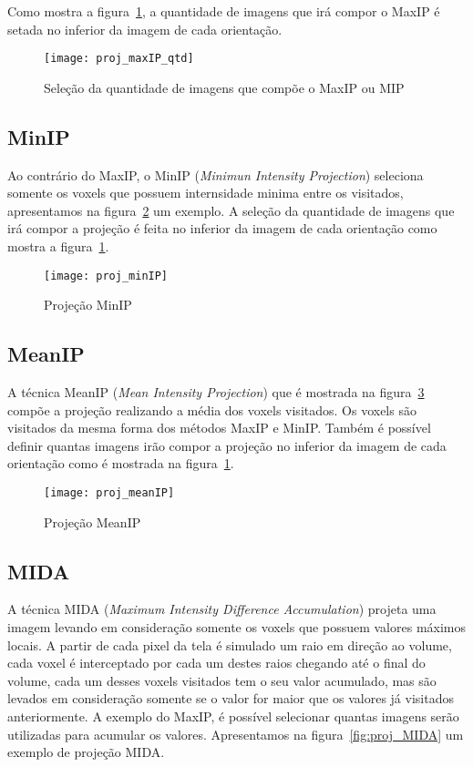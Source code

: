 Como mostra a figura~\ref{fig:proj_maxip_qtd}, a quantidade de imagens que irá compor o MaxIP é setada no inferior da imagem de cada orientação.

\begin{figure}[H]
\centering
\texttt{[image: proj\_maxIP\_qtd]}
\caption{Seleção da quantidade de imagens que compõe o MaxIP ou MIP}
\label{fig:proj_maxip_qtd}
\end{figure}

\subsection{MinIP}

Ao contrário do MaxIP, o MinIP (\textit{Minimun Intensity Projection}) seleciona somente os voxels que possuem internsidade minima entre os visitados, apresentamos na figura~\ref{fig:proj_minIP} um exemplo. A seleção da quantidade de imagens que irá compor a projeção é feita no inferior da imagem de cada orientação como mostra a figura~\ref{fig:proj_maxip_qtd}.

\begin{figure}[H]
\centering
\texttt{[image: proj\_minIP]}
\caption{Projeção MinIP}
\label{fig:proj_minIP}
\end{figure}

\subsection{MeanIP}
A técnica MeanIP (\textit{Mean Intensity Projection}) que é mostrada na figura~\ref{fig:proj_meanIP} compõe a projeção realizando a média dos voxels visitados. Os voxels são visitados da mesma forma dos métodos MaxIP e MinIP. Também é possível definir quantas imagens irão compor a projeção no inferior da imagem de cada orientação como é mostrada na figura~\ref{fig:proj_maxip_qtd}.

\begin{figure}[H]
\centering
\texttt{[image: proj\_meanIP]}
\caption{Projeção MeanIP}
\label{fig:proj_meanIP}
\end{figure}

\subsection{MIDA}
\label{sub:mida}
A técnica MIDA (\textit{Maximum Intensity Difference Accumulation}) projeta uma imagem levando em consideração somente os voxels que possuem valores máximos locais. A partir de cada pixel da tela é simulado um raio em direção ao volume, cada voxel é interceptado por cada um destes raios chegando até o final do volume, cada um desses voxels visitados tem o seu valor acumulado, mas são levados em consideração somente se o valor for maior que os valores já visitados anteriormente. A exemplo do MaxIP, é possível selecionar quantas imagens serão utilizadas para acumular os valores. Apresentamos na figura~\ref{fig:proj_MIDA} um exemplo de projeção MIDA.  

